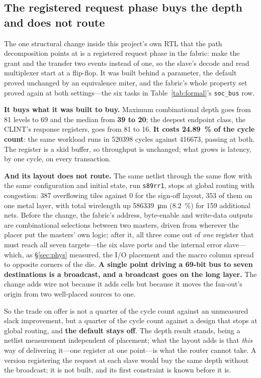 \documentclass[11pt,a4paper]{article}
\newcommand{\file}[1]{\texttt{\small #1}}
\begin{document}
\subsection{The registered request phase buys the depth and does not
route}

The one structural change inside this project's own RTL that the path
decomposition points at is a registered request phase in the fabric:
make the grant and the transfer two events instead of one, so the
slave's decode and read multiplexer start at a flip-flop. It was built
behind a parameter, the default proved unchanged by an equivalence
miter, and the fabric's whole property set proved again at both
settings---the six tasks in Table~\ref{tab:formal}'s \file{soc\_bus}
row.

\textbf{It buys what it was built to buy.} Maximum combinational depth
goes from \num{81} levels to \num{69} and the median from
\textbf{\num{39} to \num{20}}; the deepest endpoint class, the CLINT's
response registers, goes from \num{81} to \num{16}. \textbf{It costs
\SI{24.89}{\percent} of the cycle count}: the same workload runs in
\num{520398} cycles against \num{416673}, passing at both. The register
is a skid buffer, so throughput is unchanged; what grows is latency, by
one cycle, on every transaction.

\textbf{And its layout does not route.} The same netlist through the
same flow with the same configuration and initial state, run
\file{s89rr1}, stops at global routing with congestion: \num{387} overflowing tiles against \num{0}
for the sign-off layout, \num{353} of them on one metal layer, with
total wirelength up \SI{586339}{\um} (\SI{+8.2}{\percent}) for
\num{159} additional nets. Before the change, the fabric's address,
byte-enable and write-data outputs are combinational selections between
two masters, driven from wherever the placer put the masters' own
logic; after it, all three come out of \emph{one} register that must
reach all seven targets---the six slave ports and the internal error
slave---which, as \S\ref{sec:phys} measured, the I/O placement and the
macro column spread to opposite corners of the die.
\textbf{A single point driving a \num{69}-bit bus to seven destinations
is a broadcast, and a broadcast goes on the long layer.} The change
adds wire not because it adds cells but because it moves the fan-out's
origin from two well-placed sources to one.

So the trade on offer is not a quarter of the cycle count against an
unmeasured slack improvement, but a quarter of the cycle count against
a design that stops at global routing, and \textbf{the default stays
off}. The depth result stands, being a netlist measurement independent
of placement; what the layout adds is that \emph{this} way of
delivering it---one register at one point---is what the router cannot
take. A version registering the request at each slave would buy the
same depth without the broadcast; it is not built, and its first
constraint is known before it is.
\end{document}
